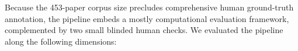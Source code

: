 \documentclass[referee,lineno,pdflatex,sn-vancouver-num]{sn-jnl}
\theoremstyle{thmstyleone}%
\theoremstyle{thmstyletwo}%
\theoremstyle{thmstylethree}%
\begin{document}

Because the 453-paper corpus size precludes comprehensive human
ground-truth annotation, the pipeline embeds a mostly computational
evaluation framework, complemented by two small blinded human checks. We
evaluated the pipeline along the following dimensions:
\end{document}
